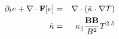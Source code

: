 \begin{eqnarray*}
  \partial_t e+\nabla\cdot {\bf F}[e]&=&\nabla \cdot (\hat{\kappa} \cdot \nabla T)
\\ 
  \hat{\kappa} &=& \kappa_\parallel \frac{{\bf B} {\bf B} }{ B^2 }T^{2.5}
\end{eqnarray*}
